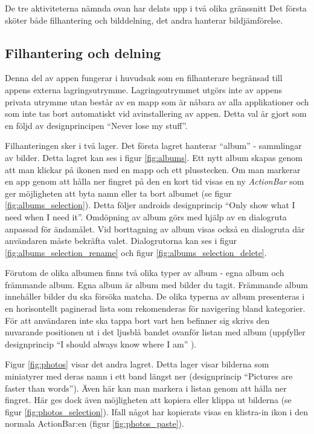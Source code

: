 \documentclass[11px, a4paper]{article}
\begin{document}
	De tre aktiviteterna nämnda ovan har delats upp i två olika gränssnitt Det första sköter både filhantering och bilddelning, det andra hanterar bildjämförelse.


\subsection{Filhantering och delning}

	Denna del av appen fungerar i huvudsak som en filhanterare begränsad till appens externa lagringsutrymme. Lagringsutrymmet utgörs inte av appens privata utrymme utan består av en mapp som är nåbara av alla applikationer och som inte tas bort automatiskt vid avinstallering av appen. Detta val är gjort som en följd av designprincipen ``Never lose my stuff''\cite{Principles}.

	Filhanteringen sker i två lager. Det första lagret hanterar ``album'' - sammlingar av bilder. Detta lagret kan ses i figur \ref{fig:albums}. Ett nytt album skapas genom att man klickar på ikonen med en mapp och ett plusstecken. Om man markerar en app genom att hålla ner fingret på den en kort tid visas en ny \emph{ActionBar}\cite{ContextActionBar} som ger möjligheten att byta namn eller ta bort albumet (se figur \ref{fig:albums_selection}). Detta följer androids designprincip ``Only show what I need when I need it''\cite{Principles}. Omdöpning av album görs med hjälp av en dialogruta anpassad för ändamålet. Vid borttagning av album visas också en dialogruta där användaren måste bekräfta valet\cite{Dialogs}. Dialogrutorna kan ses i figur \ref{fig:albums_selection_rename} och figur \ref{fig:albums_selection_delete}.

	Förutom de olika albumen finns två olika typer av album - egna album och främmande album. Egna album är album med bilder du tagit. Främmande album innehåller bilder du ska försöka matcha. De olika typerna av album presenteras i en horisontellt paginerad lista som rekomenderas för navigering bland kategorier\cite{HorizontalPaging}. För att användaren inte ska tappa bort vart hen befinner sig skrivs den nuvarande positionen ut i det ljusblå bandet ovanför listan med album (uppfyller designprincip ``I should always know where I am''\cite{Principles} ).

	Figur \ref{fig:photos} visar det andra lagret. Detta lager visar bilderna som miniatyrer med deras namn i ett band längst ner (designprincip ``Pictures are faster than words''\cite{Principles}). Även här kan man markera i listan genom att hålla ner fingret. Här ges dock även möjligheten att kopiera eller klippa ut bilderna (se figur \ref{fig:photos_selection}). Ifall något har kopierats visas en klistra-in ikon i den normala ActionBar:en (figur \ref{fig:photos_paste}).
\end{document}
